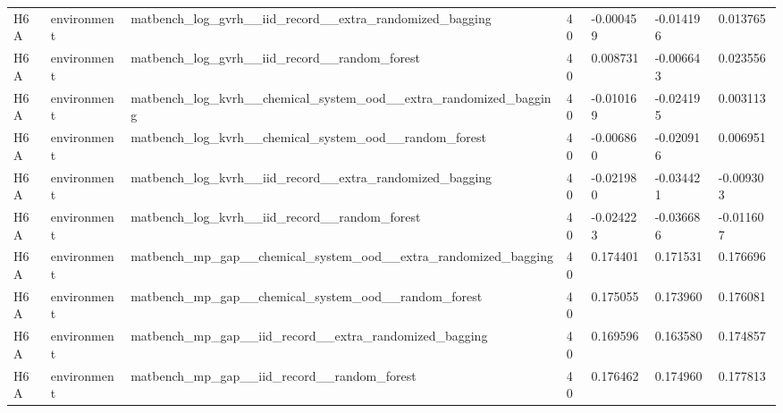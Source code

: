\documentclass[10pt]{article}
\begin{document}
\begin{landscape}
\begin{longtable}{L{.35in}L{.6in}L{3.55in}L{.4in}L{.88in}L{.88in}L{.88in}}
H6A & environment & matbench\_\allowbreak{}log\_\allowbreak{}gvrh\_\allowbreak{}\_\allowbreak{}iid\_\allowbreak{}record\_\allowbreak{}\_\allowbreak{}extra\_\allowbreak{}randomized\_\allowbreak{}bagging & 40 & -0.000459 & -0.014196 & 0.013765\\
H6A & environment & matbench\_\allowbreak{}log\_\allowbreak{}gvrh\_\allowbreak{}\_\allowbreak{}iid\_\allowbreak{}record\_\allowbreak{}\_\allowbreak{}random\_\allowbreak{}forest & 40 & 0.008731 & -0.006643 & 0.023556\\
H6A & environment & matbench\_\allowbreak{}log\_\allowbreak{}kvrh\_\allowbreak{}\_\allowbreak{}chemical\_\allowbreak{}system\_\allowbreak{}ood\_\allowbreak{}\_\allowbreak{}extra\_\allowbreak{}randomized\_\allowbreak{}bagging & 40 & -0.010169 & -0.024195 & 0.003113\\
H6A & environment & matbench\_\allowbreak{}log\_\allowbreak{}kvrh\_\allowbreak{}\_\allowbreak{}chemical\_\allowbreak{}system\_\allowbreak{}ood\_\allowbreak{}\_\allowbreak{}random\_\allowbreak{}forest & 40 & -0.006860 & -0.020916 & 0.006951\\
H6A & environment & matbench\_\allowbreak{}log\_\allowbreak{}kvrh\_\allowbreak{}\_\allowbreak{}iid\_\allowbreak{}record\_\allowbreak{}\_\allowbreak{}extra\_\allowbreak{}randomized\_\allowbreak{}bagging & 40 & -0.021980 & -0.034421 & -0.009303\\
H6A & environment & matbench\_\allowbreak{}log\_\allowbreak{}kvrh\_\allowbreak{}\_\allowbreak{}iid\_\allowbreak{}record\_\allowbreak{}\_\allowbreak{}random\_\allowbreak{}forest & 40 & -0.024223 & -0.036686 & -0.011607\\
H6A & environment & matbench\_\allowbreak{}mp\_\allowbreak{}gap\_\allowbreak{}\_\allowbreak{}chemical\_\allowbreak{}system\_\allowbreak{}ood\_\allowbreak{}\_\allowbreak{}extra\_\allowbreak{}randomized\_\allowbreak{}bagging & 40 & 0.174401 & 0.171531 & 0.176696\\
H6A & environment & matbench\_\allowbreak{}mp\_\allowbreak{}gap\_\allowbreak{}\_\allowbreak{}chemical\_\allowbreak{}system\_\allowbreak{}ood\_\allowbreak{}\_\allowbreak{}random\_\allowbreak{}forest & 40 & 0.175055 & 0.173960 & 0.176081\\
H6A & environment & matbench\_\allowbreak{}mp\_\allowbreak{}gap\_\allowbreak{}\_\allowbreak{}iid\_\allowbreak{}record\_\allowbreak{}\_\allowbreak{}extra\_\allowbreak{}randomized\_\allowbreak{}bagging & 40 & 0.169596 & 0.163580 & 0.174857\\
H6A & environment & matbench\_\allowbreak{}mp\_\allowbreak{}gap\_\allowbreak{}\_\allowbreak{}iid\_\allowbreak{}record\_\allowbreak{}\_\allowbreak{}random\_\allowbreak{}forest & 40 & 0.176462 & 0.174960 & 0.177813\\

\end{longtable}
\end{landscape}
\end{document}
